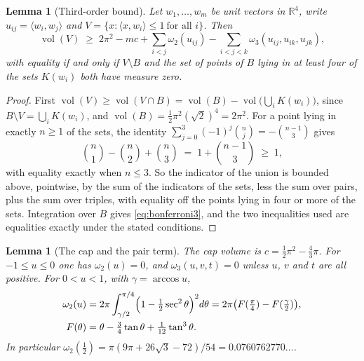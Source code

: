 \documentclass[11pt,reqno]{amsart}
\renewcommand{\_}{\origunderscore\allowbreak}
\numberwithin{equation}{section}
\theoremstyle{plain}
\newtheorem{lem}[thm]{Lemma}
\theoremstyle{definition}
\theoremstyle{remark}
\DeclareMathOperator{\vol}{vol}
\begin{document}
\begin{lem}[Third-order bound]\label{lem:bonferroni3}
Let $w_1,\dots,w_m$ be unit vectors in $\mathbb{R}^4$, write
$u_{ij}=\langle w_i,w_j\rangle$ and
$V=\{x:\langle x,w_i\rangle\le1\ \text{for all } i\}$. Then
\begin{equation}\label{eq:bonferroni3}
  \vol(V)\;\ge\;2\pi^2-mc+\sum_{i<j}\omega_2(u_{ij})
  -\sum_{i<j<k}\omega_3(u_{ij},u_{ik},u_{jk}),
\end{equation}
with equality if and only if $V\setminus B$ and the set of points of $B$
lying in at least four of the sets $K(w_i)$ both have measure zero.
\end{lem}

\begin{proof}
First $\vol(V)\ge\vol(V\cap B)=\vol(B)-\vol\bigl(\bigcup_iK(w_i)\bigr)$,
since $B\setminus V=\bigcup_iK(w_i)$, and $\vol(B)=\tfrac12\pi^2(\sqrt2)^4
=2\pi^2$. For a point lying in exactly $n\ge1$ of the sets, the identity
$\sum_{j=0}^{3}(-1)^j\binom nj=-\binom{n-1}{3}$ gives
\[
  \binom n1-\binom n2+\binom n3\;=\;1+\binom{n-1}3\;\ge\;1,
\]
with equality exactly when $n\le3$. So the indicator of the union is
bounded above, pointwise, by the sum of the indicators of the sets, less
the sum over pairs, plus the sum over triples, with equality off the
points lying in four or more of the sets. Integration over $B$ gives
\eqref{eq:bonferroni3}, and the two inequalities used are equalities
exactly under the stated conditions.
\end{proof}

\begin{lem}[The cap and the pair term]\label{lem:pair-volume}
The cap volume is $c=\tfrac12\pi^2-\tfrac43\pi$. For $-1\le u\le0$ one has
$\omega_2(u)=0$, and $\omega_3(u,v,t)=0$ unless $u$, $v$ and $t$ are all
positive. For $0<u<1$, with $\gamma=\arccos u$,
\begin{align}\label{eq:pair-volume}
  \omega_2(u)&=2\pi\int_{\gamma/2}^{\pi/4}\Bigl(1-\tfrac12\sec^2\theta\Bigr)^2d\theta
  =2\pi\bigl(F(\tfrac\pi4)-F(\tfrac\gamma2)\bigr),\\
  F(\theta)&=\theta-\tfrac34\tan\theta+\tfrac1{12}\tan^3\theta .\nonumber
\end{align}
In particular $\omega_2(\tfrac12)=\pi(9\pi+26\sqrt3-72)/54=0.0760762770\ldots$.
\end{lem}
\end{document}
